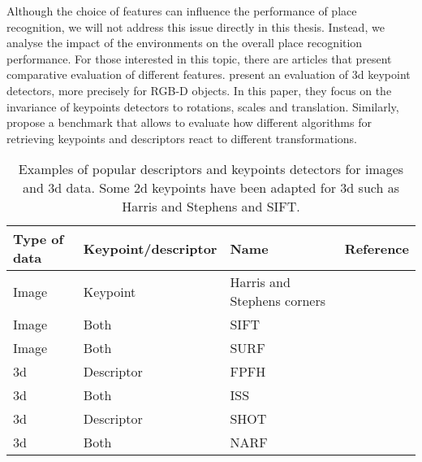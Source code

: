 Although the choice of features can influence the performance of place recognition, we will not address this issue directly in this thesis. Instead, we analyse the impact of the environments on the overall place recognition performance. For those interested in this topic, there are articles that present comparative evaluation of different features. \citet{Filipe2014} present an evaluation of \gls*{3d} keypoint detectors, more precisely for RGB-D objects. In this paper, they focus on the invariance of keypoints detectors to rotations, scales and translation. Similarly, \citet{Boyer2011} propose a benchmark that allows to evaluate how different algorithms for retrieving keypoints and descriptors react to different transformations.

\begin{table}[H]
    \centering
    \begin{tabular}{@{}llll@{}}
        \toprule
        \textbf{Type of data}  & \textbf{Keypoint/descriptor} & \textbf{Name}               & \textbf{Reference} \\
        \hline
        Image                  & Keypoint                     & Harris and Stephens corners & \cite{Harris1988}  \\
        Image                  & Both                         & SIFT                        & \cite{Lowe2004}    \\
        Image                  & Both                         & SURF                        & \cite{Bay2006}     \\
        \gls*{3d}              & Descriptor                   & FPFH                        & \cite{Rusu2009}    \\
        \gls*{3d}              & Both                         & ISS                         & \cite{Yu2009}      \\
        \gls*{3d}              & Descriptor                   & SHOT                        & \cite{Tombari2010} \\
        \gls*{3d}              & Both                         & NARF                        & \cite{Steder2011a} \\
        \bottomrule
    \end{tabular}
    \caption[Examples of popular descriptors and keypoints detectors for images and \gls*{3d} data.]{Examples of popular descriptors and keypoints detectors for images and \gls*{3d} data. Some \gls*{2d} keypoints have been adapted for \gls*{3d} such as Harris and Stephens and SIFT.}
    \label{tab:features_examples}
\end{table}

